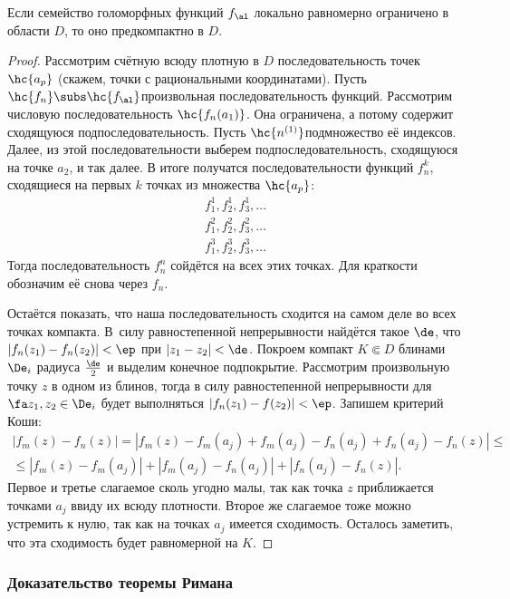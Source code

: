 \documentclass[a4paper]{article}
\begin{document}
\begin{theorem}
Если семейство голоморфных функций $f_\al$ локально равномерно ограничено в области $D$, то оно предкомпактно в $D$.
\end{theorem}
\begin{proof}
Рассмотрим счётную всюду плотную в $D$ последовательность точек $\hc{a_p}$ (скажем, точки с рациональными координатами).
Пусть $\hc{f_n}\subs\hc{f_\al}$\т произвольная последовательность функций. Рассмотрим числовую
последовательность $\hc{f_n(a_1)}$. Она ограничена, а потому содержит сходящуюся подпоследовательность.
Пусть $\hc{n^{(1)}}$\т подмножество её индексов. Далее, из этой последовательности выберем подпоследовательность,
сходящуюся на точке $a_2$, и так далее. В итоге получатся последовательности функций $f_n^{k}$, сходящиеся на первых $k$
точках из множества $\hc{a_p}$:
\begin{align*}
f_1^1, f_2^1, f_3^1, \ldots\\
f_1^2, f_2^2, f_3^2, \ldots\\
f_1^3, f_2^3, f_3^3, \ldots
\end{align*}
Тогда последовательность $f_n^n$ сойдётся на всех этих точках. Для краткости обозначим её снова через $f_n$.

Остаётся показать, что наша последовательность сходится на самом деле во всех точках компакта. В~силу
равностепенной непрерывности найдётся такое $\de$, что $|f_n(z_1)-f_n(z_2)|<\ep$ при
$|z_1-z_2|<\de$. Покроем компакт $K \Subset D$ блинами $\De_i$ радиуса $\frac{\de}{2}$ и выделим конечное
подпокрытие. Рассмотрим произвольную точку $z$ в одном из блинов, тогда в силу равностепенной непрерывности
для $\fa z_1,z_2\in \De_i$ будет выполняться $|f_n(z_1)-f(z_2)|<\ep$. Запишем критерий Коши:
\begin{multline*}
|f_m(z)-f_n(z)| = |f_m(z) - f_m(a_j) + f_m(a_j) - f_n(a_j) + f_n(a_j) - f_n(z)|\le\\\le
 |f_m(z) - f_m(a_j)| + |f_m(a_j) - f_n(a_j)| + |f_n(a_j) - f_n(z)|.
\end{multline*}
Первое и третье слагаемое сколь угодно малы, так как точка $z$ приближается точками $a_j$ ввиду их всюду плотности.
Второе же слагаемое тоже можно устремить к нулю, так как на точках $a_j$ имеется сходимость. Осталось заметить, что
эта сходимость будет равномерной на $K$.
\end{proof}

\subsubsection{Доказательство теоремы Римана}
\end{document}
